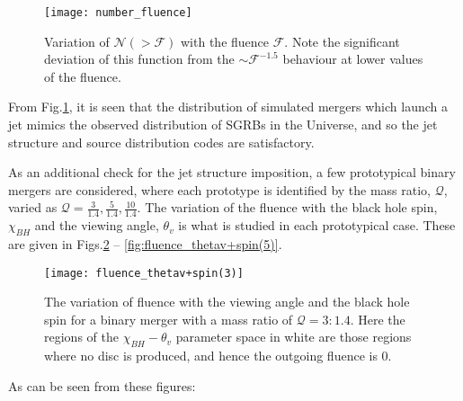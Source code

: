     \begin{figure}[H]
        \centering
        \texttt{[image: number\_fluence]}
        \caption[Variation of $\mathcal{N}(> \mathcal{F})$ with $\mathcal{F}$]{
            Variation of $\mathcal{N}(> \mathcal{F})$ with the fluence $\mathcal{F}$.
            Note the significant deviation of this function from the $\sim
            \mathcal{F}^{-1.5}$ behaviour at lower values of the fluence.
        }
        \label{fig:number_fluence}
    \end{figure}

    From Fig.\ref{fig:number_fluence}, it is seen that the distribution of simulated
    mergers which launch a jet mimics the observed distribution of SGRBs in the
    Universe, and so the jet structure and source distribution codes are satisfactory.

    As an additional check for the jet structure imposition, a few prototypical binary
    mergers are considered, where each prototype is identified by the mass ratio,
    $\mathcal{Q}$, varied as $\mathcal{Q} = \frac{3}{1.4}, \frac{5}{1.4},
    \frac{10}{1.4}$. The variation of the fluence with the black hole spin, $\chi_{BH}$
    and the viewing angle, $\theta_v$ is what is studied in each prototypical case.
    These are given in Figs.\ref{fig:fluence_thetav+spin(3)} --
    \ref{fig:fluence_thetav+spin(5)}.

    \begin{figure}[H]
        \centering
        \texttt{[image: fluence\_thetav+spin(3)]}
        \caption[Variation of $\mathcal{F}(\chi_{BH}, \theta_{v})$ for a
        $\mathcal{Q}=3:1.4$ NSBH binary merger]{
            The variation of fluence with the viewing angle and the black hole spin for
            a binary merger with a mass ratio of $\mathcal{Q}=3:1.4$. Here the regions
            of the $\chi_{BH}-\theta_v$ parameter space in white are those regions where
            no disc is produced, and hence the outgoing fluence is 0.
        }
        \label{fig:fluence_thetav+spin(3)}
    \end{figure}

    As can be seen from these figures:

